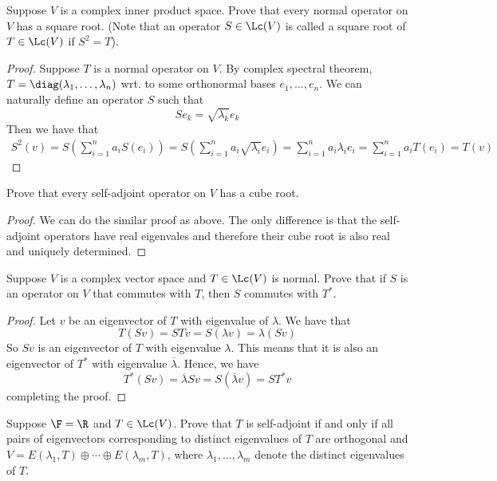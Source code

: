 \documentclass{extarticle}
\begin{document}
\begin{problem}{10}
    Suppose \(V\) is a complex inner product space. Prove that every normal operator on \(V\)
    has a square root. (Note that an operator \(S \in \Lc(V)\) is called a square root of \(T
    \in \Lc(V)\) if \(S^2 = T\)).
\end{problem}

\begin{proof}
Suppose \(T\) is a normal operator on \(V\). By complex spectral theorem, \(T = \diag(\lambda_1,
\ldots, \lambda_n)\) wrt. to some orthonormal bases \(e_1, \ldots, e_n\). We can naturally define
an operator \(S\) such that
\[Se_k = \sqrt{\lambda_k} e_k\]
Then we have that
\begin{align*}
    S^2(v) = S\left(\sum_{i=1}^{n} a_i S(e_i)\right) = S\left(\sum_{i=1}^{n} a_i \sqrt{\lambda_i} e_i \right)
    = \sum_{i=1}^{n} a_i \lambda_i e_i = \sum_{i=1}^{n} a_i T(e_i) = T(v)
\end{align*}
\end{proof}

\begin{problem}{11}
    Prove that every self-adjoint operator on \(V\) has a cube root.
\end{problem}

\begin{proof}
We can do the similar proof as above. The only difference is that the self-adjoint operators have
real eigenvales and therefore their cube root is also real and uniquely determined.
\end{proof}

\begin{problem}{12}
    Suppose \(V\) is a complex vector space and \(T \in \Lc(V)\) is normal. Prove that if \(S\)
    is an operator on \(V\) that commutes with \(T\), then \(S\) commutes with \(T^*\).
\end{problem}

\begin{proof}
Let \(v\) be an eigenvector of \(T\) with eigenvalue of \(\lambda\). We have that
\[T(Sv) = STv = S (\lambda v) = \lambda(Sv)\]
So \(Sv\) is an eigenvector of \(T\) with eigenvalue \(\lambda\). This means that it is also an eigenvector
of \(T^*\) with eigenvalue \(\overline{\lambda}\). Hence, we have
\[T^*(Sv) = \overline{\lambda}Sv = S(\overline{\lambda} v) = S T^*v\]
completing the proof.
\end{proof}

\begin{problem}{14}
    Suppose \(\F = \R\) and \(T \in \Lc(V)\). Prove that \(T\) is self-adjoint if and only if
    all pairs of eigenvectors corresponding to distinct eigenvalues of \(T\) are orthogonal and
    \(V = E(\lambda_1, T) \oplus \cdots \oplus E(\lambda_m, T)\), where \(\lambda_1, \ldots, \lambda_m\)
    denote the distinct eigenvalues of \(T\).
\end{problem}
\end{document}
